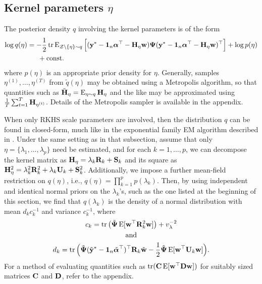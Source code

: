 \subsection{Kernel parameters $\eta$}

The posterior density $q$ involving the kernel parameters is of the form
\begin{align*}
  \log q(\eta) 
  &=  -\frac{1}{2}\operatorname{tr}\operatorname{E}_{{\mathcal Z}\backslash\{\eta\}\sim q} \Big[ 
  ({\mathbf y}^* - {\mathbf 1}_n{\bm\alpha}^\top - {\mathbf H}_\eta{\mathbf w}) {\bm\Psi} ({\mathbf y}^* - {\mathbf 1}_n{\bm\alpha}^\top - {\mathbf H}_\eta{\mathbf w})^\top \Big] + \log p(\eta) \\
  &\phantom{==} + \text{const.}\hspace{0.01em}
\end{align*}
where $p(\eta)$ is an appropriate prior density for $\eta$.
Generally, samples $\eta^{(1)},\dots,\eta^{(T)}$ from $\tilde q(\eta)$ may be obtained using a Metropolis algorithm, so that quantities such as $\tilde{{\mathbf H}}_{\eta} = \operatorname{E}_{\eta \sim q} {\mathbf H}_{\eta}$ and the like may be approximated using $\frac{1}{T}\sum_{t=1}^T {\mathbf H}_{\eta^{(t)}}$.
Details of the Metropolis sampler is available in the appendix.

When only RKHS scale parameters are involved, then the distribution $q$ can be found in closed-form, much like in the exponential family EM algorithm described in .
Under the same setting as in that subsection, assume that only $\eta = \{\lambda_1,\dots,\lambda_p\}$ need be estimated, and for each $k=1,\dots,p$, we can decompose the kernel matrix as ${\mathbf H}_\eta = \lambda_k {\mathbf R}_k + {\mathbf S}_k$ and its square as ${\mathbf H}_\eta^2 = \lambda_k^2 {\mathbf R}_k^2 + \lambda_k {\mathbf U}_k + {\mathbf S}_k^2$.
Additionally, we impose a further mean-field restriction on $q(\eta)$, i.e., $q(\eta) = \prod_{k=1}^p p(\lambda_k)$.
Then, by using independent and identical normal priors on the $\lambda_k$'s, such as the one listed at the beginning of this section, we find that $q(\lambda_k)$ is the density of a normal distribution with mean $d_kc_k^{-1}$ and variance $c_k^{-1}$, where
\begin{gather*}
  c_k = \operatorname{tr}\big(\tilde{{\bm\Psi}}\operatorname{E}[{\mathbf w}^\top{\mathbf R}_k^2{\mathbf w}]\big) + v_\lambda^{-2} \\
  \hspace{0.5cm}\text{and}\hspace{0.5cm} \\
  d_k = \operatorname{tr}\Big( \tilde{{\bm\Psi}}(\tilde{{\mathbf y}}^* - {\mathbf 1}_n\tilde{{\bm\alpha}}^\top)^\top{\mathbf R}_k \tilde{{\mathbf w}} 
  - \frac{1}{2}\tilde{{\bm\Psi}}\operatorname{E}[{\mathbf w}^\top {\mathbf U}_k {\mathbf w}] \Big). 
\end{gather*}
For a method of evaluating quantities such as $\operatorname{tr}({\mathbf C}\operatorname{E}[{\mathbf w}^\top{\mathbf D}{\mathbf w} ])$ for suitably sized matrices ${\mathbf C}$ and ${\mathbf D}$, refer to the appendix.

